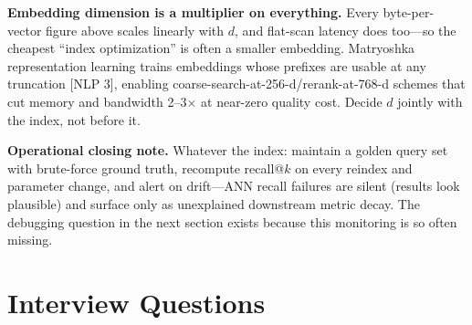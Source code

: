 \textbf{Embedding dimension is a multiplier on everything.} Every byte-per-vector figure above scales linearly with $d$, and flat-scan latency does too---so the cheapest ``index optimization'' is often a smaller embedding. Matryoshka representation learning trains embeddings whose prefixes are usable at any truncation [NLP 3], enabling coarse-search-at-256-d/rerank-at-768-d schemes that cut memory and bandwidth 2--3$\times$ at near-zero quality cost. Decide $d$ jointly with the index, not before it.

\textbf{Operational closing note.} Whatever the index: maintain a golden query set with brute-force ground truth, recompute recall@$k$ on every reindex and parameter change, and alert on drift---ANN recall failures are silent (results look plausible) and surface only as unexplained downstream metric decay. The debugging question in the next section exists because this monitoring is so often missing.

\section{Interview Questions}
\label{sr:sec:vr_interview}


